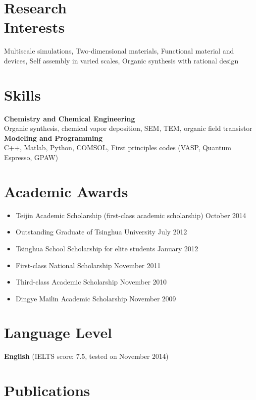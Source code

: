 \documentclass[margin]{res}
\begin{document}
\begin{resume}
 \section{Research \\Interests}
 Multiscale simulations, Two-dimensional materials, Functional material and devices, Self assembly in varied scales, Organic synthesis with  rational design 


 \section{Skills}
 \textbf{Chemistry and Chemical Engineering}\\
 Organic synthesis, chemical vapor deposition, SEM, TEM, organic field transistor
 \textbf{Modeling and Programming}\\
 C++, Matlab, Python, COMSOL, First principles codes (VASP, Quantum Espresso, GPAW)
 
                

\section{Academic Awards}
\begin{itemize}
   \item Teijin Academic Scholarship (first-class academic scholarship) \hfill October 2014
   \item Outstanding Graduate of Tsinghua University \hfill July 2012
   \item Tsinghua School Scholarship for elite students \hfill January 2012
   \item First-class National Scholarship \hfill November 2011
   \item Third-class Academic Scholarship \hfill November 2010
   \item Dingye Mailin Academic Scholarship \hfill November 2009
\end{itemize}

\section{Language Level}
\textbf{English} (IELTS score: 7.5, tested on November 2014)


\section{Publications}
\begin{enumerate}


\end{enumerate}
\end{resume}
\end{document}
